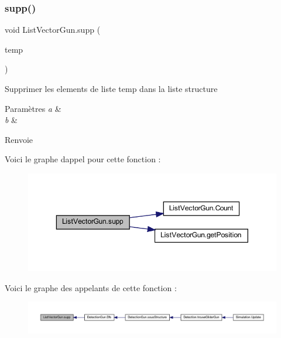 \subsubsection{\texorpdfstring{supp()}{supp()}}
{\footnotesize\ttfamily void List\+Vector\+Gun.\+supp (\begin{DoxyParamCaption}\item[{\mbox{\hyperlink{class_list_vector_gun}{List\+Vector\+Gun}}}]{temp }\end{DoxyParamCaption})\hspace{0.3cm}{\ttfamily [inline]}}



Supprimer les elements de liste temp dans la liste structure 


\begin{DoxyParams}{Paramètres}
{\em a} & \\
\hline
{\em b} & \\
\hline
\end{DoxyParams}
\begin{DoxyReturn}{Renvoie}

\end{DoxyReturn}
Voici le graphe d\textquotesingle{}appel pour cette fonction \+:
\nopagebreak
\begin{figure}[H]
\begin{center}
\leavevmode
\includegraphics[width=350pt]{class_list_vector_gun_a92aa301df19a9b1cd5f6e635e6a0c86f_cgraph}
\end{center}
\end{figure}
Voici le graphe des appelants de cette fonction \+:
\nopagebreak
\begin{figure}[H]
\begin{center}
\leavevmode
\includegraphics[width=350pt]{class_list_vector_gun_a92aa301df19a9b1cd5f6e635e6a0c86f_icgraph}
\end{center}
\end{figure}
\mbox{\label{class_list_vector_gun_a305381e8b2d20184c1894c89d2726b2c}} 
